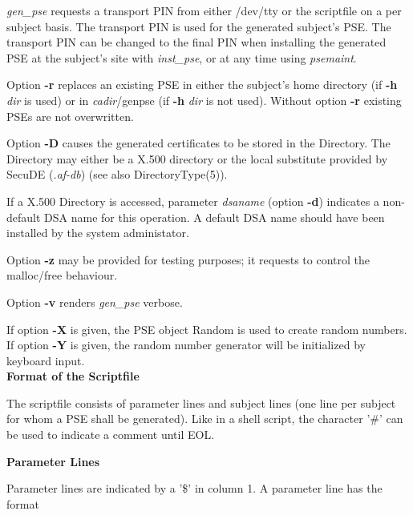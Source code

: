 {\em gen\_pse} requests a transport PIN from either /dev/tty or the scriptfile on a 
per subject basis. The transport PIN is used for the generated subject's PSE. The transport
PIN can be changed to the final PIN when installing the generated PSE at the subject's
site with {\em inst\_pse}, or at any time using {\em psemaint}.

Option {\bf -r} replaces an existing PSE in either the subject's home directory (if {\bf -h}
{\em dir} is used) or in {\em cadir}/genpse  (if {\bf -h} {\em dir} is not used). Without
option {\bf -r} existing PSEs are not overwritten.

Option {\bf -D} causes the generated certificates to be stored in the Directory.
The Directory may either be a X.500 directory or the local substitute provided by 
SecuDE ({\em .af-db}) (see also DirectoryType(5)).

If a X.500 Directory is accessed, parameter {\em dsaname} (option {\bf -d}) 
indicates a non-default DSA name for this operation. 
A default DSA name should have been installed by the system administator.

Option {\bf -z} may be provided for testing purposes; it requests to control the malloc/free behaviour.

Option {\bf -v} renders {\em gen\_pse} verbose.

If option {\bf -X} is given, the PSE object Random
is used to create random numbers.
If option {\bf -Y} is given, the random number generator
will be initialized by keyboard input.
\\ [0.5cm]
{\large\bf Format of the Scriptfile}

The scriptfile consists of parameter lines and subject lines (one line per subject
for whom a PSE shall be generated).
Like in a shell script, the character '\#' can be used to indicate a comment until EOL.

{\bf Parameter Lines}

Parameter lines are indicated by a '\$' in column 1.
A parameter line has the format

